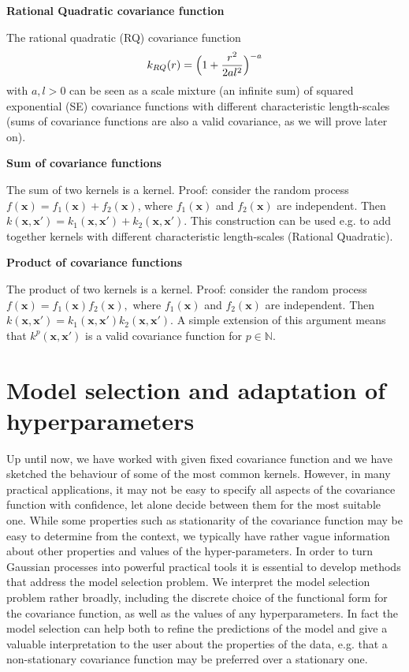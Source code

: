 \documentclass[12pt,a4paper,oneside]{book}
\theoremstyle{plain}
\theoremstyle{definition}
\begin{document}
{\vspace{3mm}
\begin{flushleft}
\textbf{Rational Quadratic covariance function}
\end{flushleft}
\noindent
The rational quadratic (RQ) covariance function $$k_{RQ}(r)=\Big{(}1+\frac{r^2}{2al^2}\Big{)}^{-a}$$ with $a,l >0$ can be seen as a scale mixture (an infinite sum) of squared exponential (SE) covariance functions with different characteristic length-scales (sums of covariance functions are also a valid covariance, as we will prove later on). 
\vspace{3mm}
\begin{flushleft}
\textbf{Sum of covariance functions}
\end{flushleft}
\noindent
The sum of two kernels is a kernel. Proof: consider the random process $f(\bm{x})=f_1(\bm{x})+f_2(\bm{x})$, where $f_1(\bm{x})$ and $f_2(\bm{x})$ are independent. Then $k(\bm{x},\bm{x}')=k_1(\bm{x},\bm{x}')+k_2(\bm{x},\bm{x}')$. This construction can be used e.g. to add together kernels with different characteristic length-scales (Rational Quadratic).
\vspace{3mm}
\begin{flushleft}
\textbf{Product of covariance functions}
\end{flushleft}
\noindent 
The product of two kernels is a kernel. Proof: consider the random process $f(\bm{x})=f_1(\bm{x})f_2(\bm{x}),$ where $f_1(\bm{x})$ and $f_2(\bm{x})$ are independent. Then $k(\bm{x},\bm{x}')=k_1(\bm{x},\bm{x}')k_2(\bm{x},\bm{x}')$. A simple extension of this argument means that $k^p(\bm{x},\bm{x}')$ is a valid covariance function for $p\in \mathbb{N}.$


\section{Model selection and adaptation of hyperparameters}
Up until now, we have worked with given fixed covariance function and we have sketched the behaviour of some of the most common kernels. However, in many practical applications, it may not be easy to specify all aspects of the covariance function with confidence, let alone decide between them for the most suitable one. While some properties such as stationarity of the covariance function may be easy to determine from the context, we typically have rather vague information about other properties and values of the hyper-parameters. In order to turn Gaussian processes into powerful practical tools it is essential to develop methods that address the model selection problem. We interpret the model selection problem rather broadly, including the discrete choice of the functional form for the covariance function, as well as the values of any hyperparameters. In fact the model selection can help both to refine the predictions of the model and give a valuable interpretation to the user about the properties of the data, e.g. that a non-stationary covariance function may be preferred over a stationary one. 

}
\end{document}
